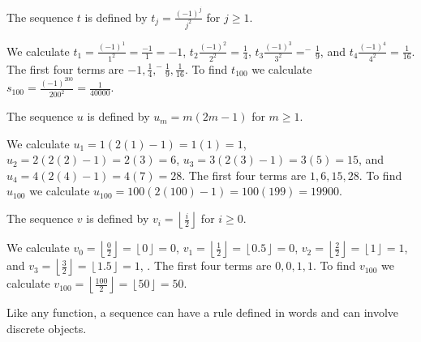\begin{exam}
\begin{apart}
            \item \label{part_eval_seq_alt_sq} The sequence $t$ is defined by $t_j=\frac{(-1)^j}{j^2}$ for $j \ge 1$.
                \begin{soln}
                    We calculate 
                    $t_1 = \frac{(-1)^1}{1^2}=\frac{-1}{1}=-1$, 
                    $t_2 \frac{(-1)^2}{2^2}= \frac{1}{4}$, 
                    $t_3 \frac{(-1)^3}{3^2}= ^-\frac{1}{9}$, and 
                    $t_4 \frac{(-1)^4}{4^2} = \frac{1}{16}$.  The first four terms are  $-1, \frac{1}{4}, ^-\frac{1}{9}, \frac{1}{16}$. To find 
                    $t_{100}$ we calculate $s_{100}=\frac{(-1)^{200}}{200^2} = \frac{1}{40000}.$ 
                \end{soln}

            \item \label{part_eval_seq_poly} The sequence $u$ is defined by $u_m = m(2m-1)$ for $m \ge 1$.
                \begin{soln}
                    We calculate $u_1 = 1(2(1)-1)=1(1)=1$, 
                    $u_2 = 2(2(2)-1)=2(3)=6$, 
                    $u_3 =3(2(3)-1)=3(5)=15$,  and 
                    $u_4 =4(2(4)-1)=4(7)=28$.  The first four terms are  $1, 6, 15, 28$. To find 
                    $u_{100}$ we calculate 
                    $u_{100}= 100(2(100)-1)=100(199)=19900$. 
                \end{soln}

            \item The sequence $v$ is defined by $v_i =  \left\lfloor \frac{i}{2} \right \rfloor$ for $i \ge 0$. 
                \begin{soln}
                    We calculate $v_0 = \left\lfloor \frac{0}{2} \right \rfloor = \left\lfloor 0 \right \rfloor= 0$, 
                    $v_1 = \left\lfloor \frac{1}{2} \right \rfloor = \left\lfloor 0.5 \right \rfloor= 0$,  
                    $v_2 = \left\lfloor \frac{2}{2} \right \rfloor = \left\lfloor 1 \right \rfloor= 1$,  and 
                    $v_3 = \left\lfloor \frac{3}{2} \right \rfloor = \left\lfloor 1.5 \right \rfloor= 1$, .  The first four terms are  $0, 0, 1, 1$. To find $v_{100}$ we calculate 
                    $v_{100}= \left\lfloor \frac{100}{2} \right \rfloor = \left\lfloor 50 \right \rfloor= 50.$ 
                \end{soln}
      \end{apart}
\end{exam}

Like any function, a sequence can have a rule defined in words and can involve discrete objects.

